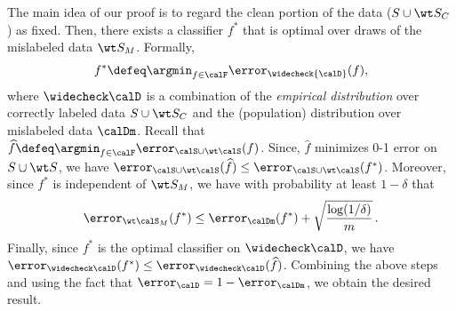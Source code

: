 \begin{hproof} 
    The main idea of our proof is to regard 
    the clean portion of the data 
    ($S \cup \wt S_C$) as fixed.
    Then, there exists a classifier $f^*$ 
    that is optimal over draws 
    of the mislabeled data $\wt S_M$.
    Formally, 
    \begin{align*}
        f^* \defeq \argmin_{f \in \calF} \error_{\widecheck {\calD}} (f),
    \end{align*}
    where $\widecheck \calD$ is a combination of 
    the \emph{empirical distribution} 
    over correctly labeled data $S \cup \wt S_C$
    and the (population) distribution 
    over mislabeled data $\calDm$. 
    Recall that $\widehat f \defeq \argmin_{f \in \calF} \error_{\calS \cup \wt \calS } (f)$. 
    Since, $\widehat f$ minimizes 0-1 error 
    on $S \cup \wt S$, 
    we have $\error_{\calS \cup \wt \calS}(\widehat f) \le \error_{
    \calS \cup \wt \calS}(f^*)$. 
    Moreover, since $f^*$ is independent of $\wt S_M$, 
    we have with probability at least $1-\delta$ that
    \begin{align*}
      \error_{\wt \calS_M}(f^*) \le \error_{ \calDm}(f^*) +  \sqrt{\frac{\log(1/\delta)}{m}} \,. 
    \end{align*}
    Finally, since $f^*$ is the optimal classifier on $\widecheck \calD$, 
    we have $\error_{\widecheck \calD}(f^*) \le \error_{\widecheck \calD}(\widehat f)$.     
    Combining the above steps and using the fact 
    that $\error_\calD = 1- \error_{\calDm} $, 
    we obtain the desired result.  
\end{hproof}
% 

